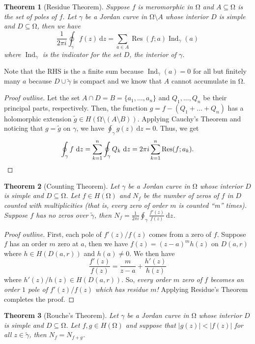 \documentclass[letterpaper,12pt]{article}
\theoremstyle{definition}
\theoremstyle{plain}
\newtheorem{thm}{Theorem}[section]
\theoremstyle{remark}
\newcommand{\wt}{\widetilde}
\let\oldOmega\Omega
\renewcommand{\Omega}{\mathrm{\oldOmega}}
\DeclareMathOperator{\Res}{Res}
\DeclareMathOperator{\Ind}{Ind}
\begin{document}
\begin{thm}[Residue Theorem]
Suppose $f$ is meromorphic in $\Omega$ and $A\subseteq \Omega$ is the set of poles of $f$. Let $\gamma$ be a Jordan curve in $\Omega\setminus A$ whose interior $D$ is simple and $D\subseteq \Omega$, then we have
\[\frac{1}{2\pi i}\oint_\gamma f(z)\ \mathrm{d}z = \sum_{a\in A}\Res(f;a)\Ind_\gamma(a)\]
where $\Ind_\gamma$ is the indicator for the set $D$, the interior of $\gamma$.
\end{thm}

Note that the RHS is the a finite sum because $\Ind_\gamma(a)=0$ for all but finitely many $a$ because $D\cup \wt{\gamma}$ is compact and we know that $A$ cannot accumulate in $\Omega$.

\begin{proof}[Proof outline]
Let the set $A\cap D = B = \{a_1,\ldots,a_n\}$ and $Q_1,\dots,Q_n$ be their principal parts, respectively. Then, the function $g = f-(Q_1+\dots+Q_n)$ has a holomorphic extension $\wt{g}\in H(\Omega\setminus(A\setminus B))$. Applying Cauchy's Theorem and noticing that $g=\wt{g}$ on $\gamma$, we have $\oint_\gamma g(z)\ \mathrm{d}z = 0$. Thus, we get
\[\oint_\gamma f\ \mathrm{d}z = \sum_{k=1}^n \oint_\gamma Q_k\ \mathrm{d}z = 2\pi i \sum_{k=1}^n \Res(f; a_k).\qedhere\]
\end{proof}

\begin{thm}[Counting Theorem]
Let $\gamma$ be a Jordan curve in $\Omega$ whose interior $D$ is simple and $D\subseteq \Omega$. Let $f\in H(\Omega)$ and $N_f$ be the number of zeros of $f$ in $D$ counted with multiplicities (that is, every zero of order $m$ is counted ``m'' times). Suppose $f$ has no zeros over $\wt{\gamma}$, then $N_f = \frac{1}{2\pi i}\oint_\gamma \frac{f'(z)}{f(z)}\ \mathrm{d}z$.
\end{thm}

\begin{proof}[Proof outline]
First, each pole of $f'(z)/f(z)$ comes from a zero of $f$. Suppose $f$ has an order $m$ zero at $a$, then we have $f(z) = (z-a)^mh(z)$ on $D(a,r)$ where $h\in H(D(a,r))$ and $h(a)\ne 0$. We then have
\[\frac{f'(z)}{f(z)} = \frac{m}{z-a} + \frac{h'(z)}{h(z)}\]
where $h'(z)/h(z)\in H(D(a,r))$. So, \emph{every order $m$ zero of $f$ becomes an order $1$ pole of $f'(z)/f(z)$ which has residue $m$!} Applying Residue's Theorem completes the proof.
\end{proof}

\begin{thm}[Rouche's Theorem]
Let $\gamma$ be a Jordan curve in $\Omega$ whose interior $D$ is simple and $D\subseteq \Omega$. Let $f,g\in H(\Omega)$ and suppose that $|g(z)|<|f(z)|$ for all $z\in\wt{\gamma}$, then $N_f = N_{f+g}$.
\end{thm}
\end{document}

